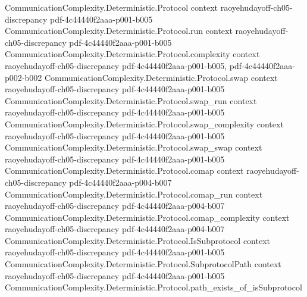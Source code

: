 \begin{lemma}
\label{CommunicationComplexity.Functions.InnerProduct.integral_sq_indicator_mul_boolSign_innerProduct_le}
\leanok
{}
\proofstep
  {CommunicationComplexity.Deterministic.Protocol}
  {context}
  {raoyehudayoff-ch05-discrepancy}
  {pdf-4c44440f2aaa-p001-b005}
\proofstep
  {CommunicationComplexity.Deterministic.Protocol.run}
  {context}
  {raoyehudayoff-ch05-discrepancy}
  {pdf-4c44440f2aaa-p001-b005}
\proofstep
  {CommunicationComplexity.Deterministic.Protocol.complexity}
  {context}
  {raoyehudayoff-ch05-discrepancy}
  {pdf-4c44440f2aaa-p001-b005,
    pdf-4c44440f2aaa-p002-b002}
\proofstep
  {CommunicationComplexity.Deterministic.Protocol.swap}
  {context}
  {raoyehudayoff-ch05-discrepancy}
  {pdf-4c44440f2aaa-p001-b005}
\proofstep
  {CommunicationComplexity.Deterministic.Protocol.swap_run}
  {context}
  {raoyehudayoff-ch05-discrepancy}
  {pdf-4c44440f2aaa-p001-b005}
\proofstep
  {CommunicationComplexity.Deterministic.Protocol.swap_complexity}
  {context}
  {raoyehudayoff-ch05-discrepancy}
  {pdf-4c44440f2aaa-p001-b005}
\proofstep
  {CommunicationComplexity.Deterministic.Protocol.swap_swap}
  {context}
  {raoyehudayoff-ch05-discrepancy}
  {pdf-4c44440f2aaa-p001-b005}
\proofstep
  {CommunicationComplexity.Deterministic.Protocol.comap}
  {context}
  {raoyehudayoff-ch05-discrepancy}
  {pdf-4c44440f2aaa-p004-b007}
\proofstep
  {CommunicationComplexity.Deterministic.Protocol.comap_run}
  {context}
  {raoyehudayoff-ch05-discrepancy}
  {pdf-4c44440f2aaa-p004-b007}
\proofstep
  {CommunicationComplexity.Deterministic.Protocol.comap_complexity}
  {context}
  {raoyehudayoff-ch05-discrepancy}
  {pdf-4c44440f2aaa-p004-b007}
\proofstep
  {CommunicationComplexity.Deterministic.Protocol.IsSubprotocol}
  {context}
  {raoyehudayoff-ch05-discrepancy}
  {pdf-4c44440f2aaa-p001-b005}
\proofstep
  {CommunicationComplexity.Deterministic.Protocol.SubprotocolPath}
  {context}
  {raoyehudayoff-ch05-discrepancy}
  {pdf-4c44440f2aaa-p001-b005}
\proofstep
  {CommunicationComplexity.Deterministic.Protocol.path_exists_of_isSubprotocol}

\end{lemma}
